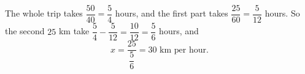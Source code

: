 The whole trip takes $\dfrac{50}{40}=\dfrac54$ hours, and the first part takes $\dfrac{25}{60}=\dfrac5{12}$ hours. So the second $25$ km take $\dfrac54-\dfrac5{12}=\dfrac{10}{12}=\dfrac56$ hours, and
\[x=\dfrac{25}{\dfrac56}=\boxed{30}\text{ km per hour}.\]
